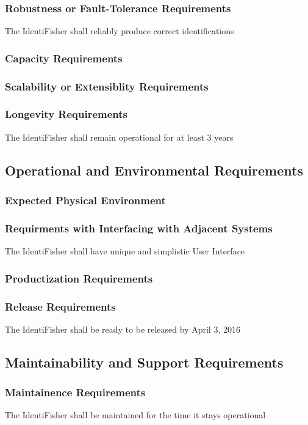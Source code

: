 \documentclass{article}
\begin{document}
\subsubsection{Robustness or Fault-Tolerance Requirements}
The IdentiFisher shall reliably produce correct identifications
\subsubsection{Capacity Requirements}
\subsubsection{Scalability or Extensiblity Requirements}
\subsubsection{Longevity Requirements}
The IdentiFisher shall remain operational for at least 3 years

\subsection{Operational and Environmental Requirements}
\subsubsection{Expected Physical Environment}
\subsubsection{Requirments with Interfacing with Adjacent Systems}
The IdentiFisher shall have unique and simplistic User Interface
\subsubsection{Productization Requirements}
\subsubsection{Release Requirements}
The IdentiFisher shall be ready to be released by April 3, 2016

\subsection{Maintainability and Support Requirements}
\subsubsection{Maintainence Requirements}
The IdentiFisher shall be maintained for the time it stays operational
\end{document}
